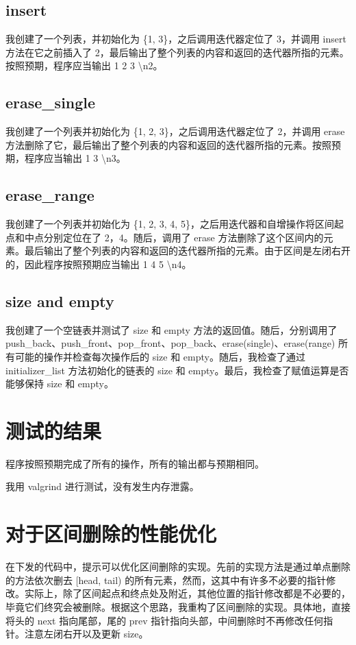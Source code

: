 \documentclass[UTF8]{ctexart}
\begin{document}
\subsection{insert}
我创建了一个列表，并初始化为 \{1, 3\}，之后调用迭代器定位了 3，并调用 insert 方法在它之前插入了 2，最后输出了整个列表的内容和返回的迭代器所指的元素。按照预期，程序应当输出 1 2 3 \textbackslash n2。
\subsection{erase\_single}
我创建了一个列表并初始化为 \{1, 2, 3\}，之后调用迭代器定位了 2，并调用 erase 方法删除了它，最后输出了整个列表的内容和返回的迭代器所指的元素。按照预期，程序应当输出 1 3 \textbackslash n3。
\subsection{erase\_range}
我创建了一个列表并初始化为 \{1, 2, 3, 4, 5\}，之后用迭代器和自增操作将区间起点和中点分别定位在了 2，4。随后，调用了 erase 方法删除了这个区间内的元素。最后输出了整个列表的内容和返回的迭代器所指的元素。由于区间是左闭右开的，因此程序按照预期应当输出 1 4 5 \textbackslash n4。
\subsection{size and empty}
我创建了一个空链表并测试了 size 和 empty 方法的返回值。随后，分别调用了 push\_back、push\_front、pop\_front、pop\_back、erase(single)、erase(range) 所有可能的操作并检查每次操作后的 size 和 empty。随后，我检查了通过 initializer\_list 方法初始化的链表的 size 和 empty。最后，我检查了赋值运算是否能够保持 size 和 empty。


\section{测试的结果}

程序按照预期完成了所有的操作，所有的输出都与预期相同。

我用 valgrind 进行测试，没有发生内存泄露。

\section{对于区间删除的性能优化}

在下发的代码中，提示可以优化区间删除的实现。先前的实现方法是通过单点删除的方法依次删去 [head, tail) 的所有元素，然而，这其中有许多不必要的指针修改。实际上，除了区间起点和终点处及附近，其他位置的指针修改都是不必要的，毕竟它们终究会被删除。根据这个思路，我重构了区间删除的实现。具体地，直接将头的 next 指向尾部，尾的 prev 指针指向头部，中间删除时不再修改任何指针。注意左闭右开以及更新 size。
\end{document}
